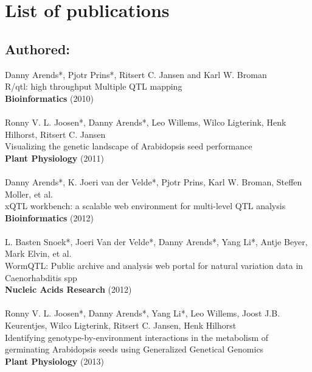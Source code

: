 \documentclass[8pt, twoside, a5paper]{report}
\newcommand{\authors}[1]{\small{#1}}
\newcommand{\bold}[1]{{\bfseries #1}}
\begin{document}
\newpage

\section*{List of publications}
\subsection*{Authored:}
  \authors{Danny Arends*, Pjotr Prins*, Ritsert C. Jansen and Karl W. Broman}\\
  R/qtl: high throughput Multiple QTL mapping\\
  \bold{Bioinformatics} (2010)\\\\
  \authors{Ronny V. L. Joosen*, Danny Arends*, Leo Willems, Wilco Ligterink, Henk Hilhorst, Ritsert C. Jansen}\\
  Visualizing the genetic landscape of Arabidopsis seed performance\\
  \bold{Plant Physiology} (2011)\\\\
  \authors{Danny Arends*, K. Joeri van der Velde*, Pjotr Prins, Karl W. Broman, Steffen Moller, et al.}\\
  xQTL workbench: a scalable web environment for multi-level QTL analysis\\
  \bold{Bioinformatics} (2012)\\\\
  \authors{L. Basten Snoek*, Joeri Van der Velde*, Danny Arends*, Yang Li*, Antje Beyer, Mark Elvin, et al.}\\
  WormQTL: Public archive and analysis web portal for natural variation data in Caenorhabditis spp\\
  \bold{Nucleic Acids Research} (2012)\\\\
  \authors{Ronny V. L. Joosen*, Danny Arends*, Yang Li*, Leo Willems, Joost J.B. Keurentjes, Wilco Ligterink, Ritsert C. Jansen, Henk Hilhorst}\\
  Identifying genotype-by-environment interactions in the metabolism of germinating Arabidopsis seeds using Generalized Genetical Genomics\\
  \bold{Plant Physiology} (2013)
\end{document}
